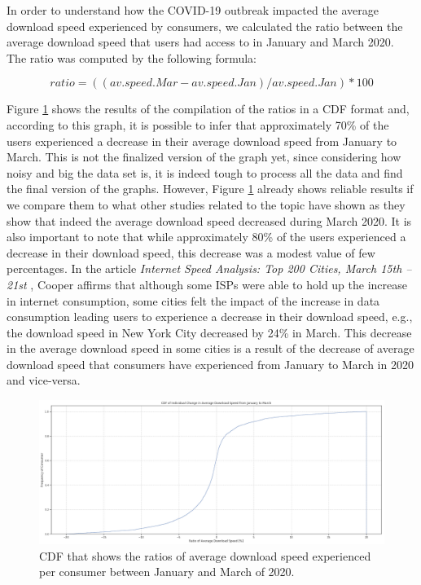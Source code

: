 \documentclass[conference,10pt]{IEEEtran}
\begin{document}
In order to understand how the COVID-19 outbreak impacted the average download speed experienced by consumers, we calculated the ratio between the average download speed that users had access to in January and March 2020. The ratio was computed by the following formula:

\begin{equation}
ratio= ((av.speed.Mar - av.speed.Jan)/ av.speed.Jan)*100
\end{equation}

Figure \ref{fig:downloadspeed2020} shows the results of the compilation of the ratios in a CDF format and, according to this graph, it is possible to infer that approximately 70\% of the users experienced a decrease in their average download speed from January to March. This is not the finalized version of the graph yet, since considering how noisy and big the data set is, it is indeed tough to process all the data and find the final version of the graphs. However, Figure \ref{fig:downloadspeed2020} already shows reliable results if we compare them to what other studies related to the topic have shown as they show that indeed the average download speed decreased during March 2020. It is also important to note that while approximately 80\% of the users experienced a decrease in their download speed, this decrease was a modest value of few percentages. In the article \textit{Internet Speed Analysis: Top 200 Cities, March 15th – 21st} \cite{cooper}, Cooper affirms that although some ISPs were able to hold up the increase in  internet consumption, some cities felt the impact of the increase in data consumption leading users to experience a decrease in their download speed, e.g., the download speed in New York City decreased by 24\% in March. This decrease in the average download speed in some cities is a result of the decrease of average download speed that consumers have experienced from January to March in 2020 and vice-versa.

\begin{figure}
\centering
\includegraphics[width=1.0\linewidth]{figs/downspeed.PNG}
\caption{CDF that shows the ratios of average download speed experienced per consumer between January and March of 2020.}
\label{fig:downloadspeed2020}
\end{figure}
\end{document}
